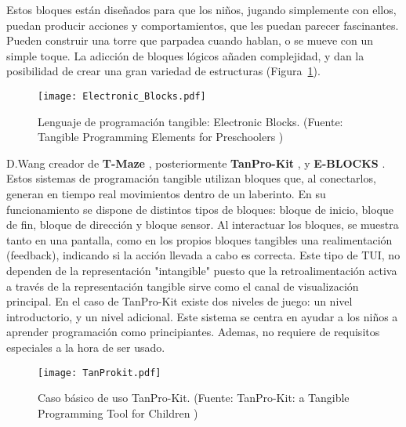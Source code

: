 Estos bloques están diseñados para que los niños, jugando simplemente con ellos, puedan producir acciones y comportamientos, que les puedan parecer fascinantes. Pueden construir una torre que parpadea cuando hablan, o se mueve con un simple toque. La adicción de bloques lógicos añaden complejidad, y dan la posibilidad de crear una gran variedad de estructuras (Figura~\ref{fig:ElectronicBlocks}).

\begin{figure}[!h]
\begin{center}
\texttt{[image: Electronic\_Blocks.pdf]}
\caption{Lenguaje de programación tangible: Electronic Blocks. (Fuente: Tangible Programming Elements for Preschoolers \cite{Wyeth})}
\label{fig:ElectronicBlocks}
\end{center}
\end{figure}


D.Wang creador de \textbf{T-Maze} \cite{Wang_T-Maze}, posteriormente \textbf{TanPro-Kit} \cite{Wang_TanPro-kit}, y \textbf{E-BLOCKS} \cite{Wang_E-BLOCKS}. Estos sistemas de programación tangible utilizan bloques que, al conectarlos, generan en tiempo real movimientos dentro de un laberinto. En su funcionamiento se dispone de distintos tipos de bloques: bloque de inicio, bloque de fin, bloque de dirección y bloque sensor. Al interactuar los bloques, se muestra tanto en una pantalla, como en los propios bloques tangibles una realimentación (feedback), indicando si la acción llevada a cabo es correcta. Este tipo de TUI, no dependen de la representación "intangible" puesto que la retroalimentación activa a través de la representación tangible sirve como el canal de visualización principal.
En el caso de TanPro-Kit existe dos niveles de juego: un nivel introductorio, y un nivel adicional. Este sistema se centra en ayudar a los niños a aprender programación como principiantes. Ademas, no requiere de requisitos especiales a la hora de ser usado.


\begin{figure}[!h]
\begin{center}
\texttt{[image: TanProkit.pdf]}
\caption{Caso básico de uso TanPro-Kit. (Fuente: TanPro-Kit: a Tangible Programming Tool for Children \cite{Wang_TanPro-kit})}
\label{fig:TanProKit}
\end{center}
\end{figure}


